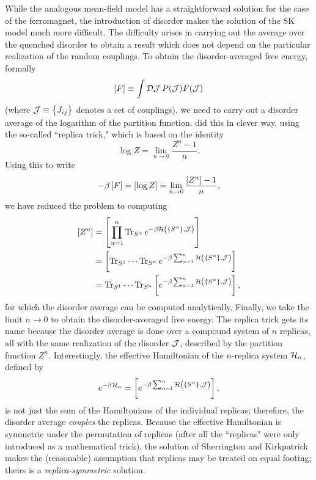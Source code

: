 While the analogous mean-field model has a straightforward solution for the
case of the ferromagnet, the introduction of disorder makes the solution of the
SK model much more difficult. The difficulty arises in carrying out the average
over the quenched disorder to obtain a result which does not depend on the
particular realization of the random couplings. To obtain the disorder-averaged
free energy, formally
\begin{equation}
  \left[F\right] \equiv \int \mathcal{D}\mathcal{J} \, P(\mathcal{J}) F(\mathcal{J})
\end{equation}
(where $\JJ \equiv \cbr{J_{ij}}$ denotes a set of couplings), we need to carry
out a disorder average of the logarithm of the partition function.
\textcite{sherrington1975solvable} did this in clever way, using the so-called
``replica trick," which is based on the identity
\begin{equation}
  \log Z = \lim_{n \to 0} \frac{Z^n-1}{n}.
\end{equation}
Using this to write
\begin{equation}
  -\beta \left[F\right]
  = \left[\log Z\right]
  = \lim_{n \to 0} \frac{\left[Z^n\right]-1}{n},
\end{equation}
we have reduced the problem to computing
\begin{align*}
  \davc{Z^n}
  &=\davc{\prod_{\alpha=1}^n \Tr_{S^{\alpha}}
    e^{-\beta\ham\del{\cbr{S^{\alpha}},\JJ}}} \\
  &=\davc{\Tr_{S^{1}} \cdots \Tr_{S^{n}}
    e^{-\beta\sum_{\alpha=1}^n
    \ham\del{\cbr{S^{\alpha}},\JJ}}} \\
  &=\Tr_{S^{1}} \cdots \Tr_{S^{n}}
    \davc{e^{-\beta\sum_{\alpha=1}^n
    \ham\del{\cbr{S^{\alpha}},\JJ}}},
\end{align*}
for which the disorder average can be computed analytically. Finally, we take
the limit $n \to 0$ to obtain the disorder-averaged free energy. The replica
trick gets its name because the disorder average is done over a compound system
of $n$ replicas, all with the same realization of the disorder $\mathcal{J}$, described
by the partition function $Z^n$. Interestingly, the effective Hamiltonian of
the $n$-replica system $\mathcal{H}_n$, defined by
\begin{equation}
  e^{-\beta\ham_n} =
  \davc{e^{-\beta\sum_{\alpha=1}^n
  \ham\del{\cbr{S^{\alpha}},\JJ}}},
\end{equation}
is not just the sum of the Hamiltonians of the individual replicas; therefore,
the disorder average \emph{couples} the replicas. Because the effective
Hamiltonian is symmetric under the permutation of replicas (after all the
``replicas" were only introduced as a mathematical trick), the solution of
Sherrington and Kirkpatrick makes the (reasonable) assumption that replicas may
be treated on equal footing; theirs is a \emph{replica-symmetric} solution.

